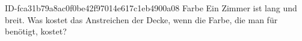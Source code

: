\begin{exercise}
      {ID-fca31b79a8ac0f0be42f97014e617c1eb4900a08}
      {Farbe}
  \ifproblem\problem
    Ein Zimmer ist  lang und  breit. Was kostet das Anstreichen
    der Decke, wenn die Farbe, die man für  benötigt,  kostet?
  \fi
\end{exercise}

